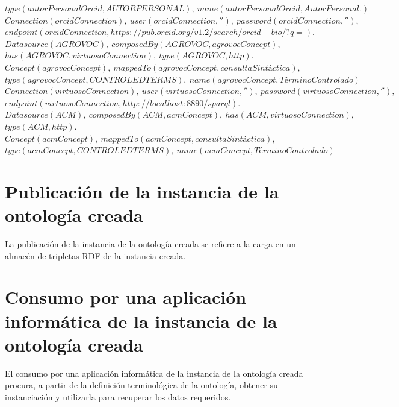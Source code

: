 \begin{minipage}{\textwidth}
$type(autorPersonalOrcid,AUTORPERSONAL), \ name(autorPersonalOrcid, Autor Personal.)$ \\
$Connection(orcidConnection), \ user(orcidConnection, ''), \ password(orcidConnection, ''),$
$endpoint(orcidConnection, https://pub.orcid.org/v1.2/search/orcid-bio/?q=).$\\
$Datasource(AGROVOC), \ composedBy(AGROVOC, agrovocConcept),$\\
$has(AGROVOC, virtuosoConnection), \ type(AGROVOC,http).$ \\
$Concept(agrovocConcept), \ mappedTo(agrovocConcept, consultaSintáctica), $\\
$type(agrovocConcept, CONTROLEDTERMS), \ name(agrovocConcept, Término Controlado)$\\
$Connection(virtuosoConnection), \ user(virtuosoConnection, ''), \ password(virtuosoConnection, ''),$
$endpoint(virtuosoConnection, http://localhost:8890/sparql).$\\
$Datasource(ACM), \ composedBy(ACM, acmConcept), \ has(ACM, virtuosoConnection),$\\
$type(ACM,http).$ \\
$Concept(acmConcept), \ mappedTo(acmConcept,consultaSintáctica),$\\
$type(acmConcept,CONTROLEDTERMS),  \ name(acmConcept, Término Controlado)$\\
\end{minipage}



\section{Publicación de la instancia de la ontología creada}

La publicación de la instancia de la ontología creada se refiere a la carga en un almacén de tripletas RDF de la instancia creada.

\section{Consumo por una aplicación informática de la instancia de la ontología creada}

El consumo por una aplicación informática de la instancia de la ontología creada procura, a partir de la definición terminológica de la ontología, obtener su instanciación y utilizarla para recuperar los datos requeridos.







